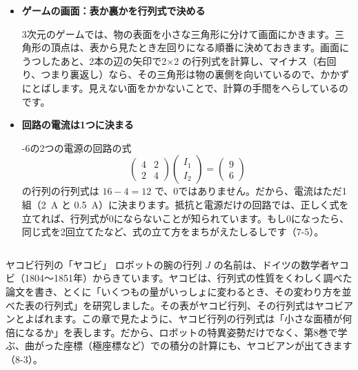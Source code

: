 \begin{butsuri}
\begin{itemize}[leftmargin=1.2\zw, itemsep=3pt, topsep=0pt, label={\color{bkPurple}●}]
\item \textbf{ゲームの画面：表か裏かを行列式で決める}\par\noindent\begin{minipage}[c]{0.70\linewidth}
3次元のゲームでは、物の表面を小さな三角形に分けて画面にかきます。三角形の頂点は、表から見たとき左回りになる順番に決めておきます。画面にうつしたあと、2本の辺の矢印で2×2 の行列式を計算し、マイナス（右回り、つまり裏返し）なら、その三角形は物の裏側を向いているので、かかずにとばします。見えない面をかかないことで、計算の手間をへらしているのです。
\end{minipage}\hfill
\begin{minipage}[c]{0.27\linewidth}\centering
{}
\end{minipage}
\item \textbf{回路の電流は1つに決まる}\par{}-6の2つの電源の回路の式
\[ \begin{pmatrix}4&2\\2&4\end{pmatrix}\begin{pmatrix}I_1\\I_2\end{pmatrix}=\begin{pmatrix}9\\6\end{pmatrix} \]
の行列の行列式は $16-4=12$ で、0ではありません。だから、電流はただ1組（\qty{2}{A} と \qty{0.5}{A}）に決まります。抵抗と電源だけの回路では、正しく式を立てれば、行列式が0にならないことが知られています。もし0になったら、同じ式を2回立てたなど、式の立て方をまちがえたしるしです（7-5）。
\end{itemize}
\end{butsuri}

\begin{column}{ヤコビ行列の「ヤコビ」}
ロボットの腕の行列 $J$ の名前は、ドイツの数学者ヤコビ（1804〜1851年）からきています。ヤコビは、行列式の性質をくわしく調べた論文を書き、とくに「いくつもの量がいっしょに変わるとき、その変わり方を並べた表の行列式」を研究しました。その表がヤコビ行列、その行列式はヤコビアンとよばれます。この章で見たように、ヤコビ行列の行列式は「小さな面積が何倍になるか」を表します。だから、ロボットの特異姿勢だけでなく、第8巻で学ぶ、曲がった座標（極座標など）での積分の計算にも、ヤコビアンが出てきます（8-3）。
\end{column}

